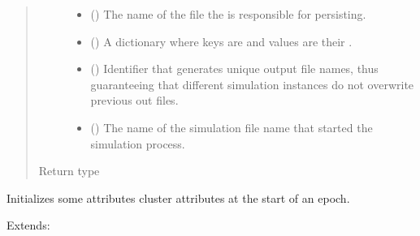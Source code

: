 \documentclass[letterpaper,10pt,english]{sphinxmanual}
\begin{document}
\begin{fulllineitems}
\begin{fulllineitems}
\begin{quote}
\begin{description}
\begin{itemize}
\item {} 
 () \textendash{} The name of the file the  is responsible for
persisting.

\item {} 
 ({\hyperref[\detokenize{app:app.type_hints.NodeDict}]{}}) \textendash{} A dictionary where keys are {\hyperref[\detokenize{app.domain:app.domain.network_nodes.Node.id}]{}} and values are their
{\hyperref[\detokenize{app.domain:app.domain.network_nodes.Node}]{}}.

\item {} 
 () \textendash{} Identifier that generates unique output file names,
thus guaranteeing that different simulation instances do not
overwrite previous out files.

\item {} 
 () \textendash{} The name of the simulation file name that started
the simulation process.

\end{itemize}

\item[{Return type}] \leavevmode
{}

\end{description}\end{quote}

\end{fulllineitems}


\begin{fulllineitems}
\label{\detokenize{app.domain:app.domain.cluster_groups.NewscastCluster._setup_epoch}}
Initializes some attributes cluster attributes at the start of an
epoch.
\begin{description}
\item[{Extends:}] \leavevmode
{\hyperref[\detokenize{app.domain:app.domain.cluster_groups.Cluster._setup_epoch}]{}}


\end{description}
\end{fulllineitems}
\end{fulllineitems}
\end{document}

